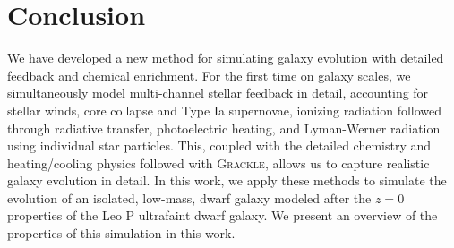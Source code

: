 \documentclass[twocolumn]{aastex61}
\begin{document}
\section{Conclusion}
\label{sec:conclusion}
We have developed a new method for simulating galaxy evolution with detailed feedback and chemical enrichment. For the first time on galaxy scales, we simultaneously model multi-channel stellar feedback in detail, accounting for stellar winds, core collapse and Type Ia supernovae, ionizing radiation followed through radiative transfer, photoelectric heating, and Lyman-Werner radiation using individual star particles. This, coupled with the detailed chemistry and heating/cooling physics followed with \textsc{Grackle}, allows us to capture realistic galaxy evolution in detail. In this work, we apply these methods to simulate the evolution of an isolated, low-mass, dwarf galaxy modeled after the $z=0$ properties of the Leo P ultrafaint dwarf galaxy. We present an overview of the properties of this 
    simulation 
in this work.
\end{document}
